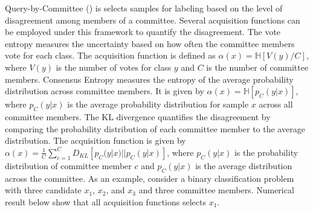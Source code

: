 \documentclass[
  letterpaper,
  numbers=noenddot,
  DIV=11]{scrreprt}
\theoremstyle{plain}
\theoremstyle{definition}
\theoremstyle{remark}
\begin{document}
Query-by-Committee () is
selects samples for labeling based on the level of disagreement among
members of a committee. Several acquisition functions can be employed
under this framework to quantify the disagreement. The vote entropy
measures the uncertainty based on how often the committee members vote
for each class. The acquisition function is defined as
\(\alpha(x) = \mathbb{H}\left[V(y)/C\right]\), where \(V(y)\) is the
number of votes for class \(y\) and \(C\) is the number of committee
members. Consensus Entropy measures the entropy of the average
probability distribution across committee members. It is given by
\(\alpha(x) = \mathbb{H}[p_C(y|x)]\), where \(p_C(y|x)\) is the average
probability distribution for sample \(x\) across all committee members.
The KL divergence quantifies the disagreement by comparing the
probability distribution of each committee member to the average
distribution. The acquisition function is given by
\(\alpha(x) = \frac{1}{C} \sum_{c=1}^{C} D_{KL}[p_C(y|x) || p_C(y|x)]\),
where \(p_C(y|x)\) is the probability distribution of committee member
\(c\) and \(p_C(y|x)\) is the average distribution across the committee.
As an example, consider a binary classification problem with three
candidate \(x_1\), \(x_2\), and \(x_3\) and three committee members.
Numerical result below show that all acquisition functions selects
\(x_1\).
\end{document}
